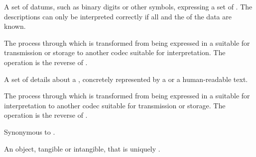 {%

A set of datums, such as binary digits or other symbols, expressing a set of .
The descriptions can only be interpreted correctly if all  and the  of the data are known.

The process through which  is transformed from being expressed in a  suitable for transmission or storage to another codec suitable for interpretation.
The operation is the reverse of .

A set of details about a , concretely represented by a  or a human-readable text.




The process through which  is transformed from being expressed in a  suitable for interpretation to another codec suitable for transmission or storage.
The operation is the reverse of .

Synonymous to .

An object, tangible or intangible, that is uniquely .


}
